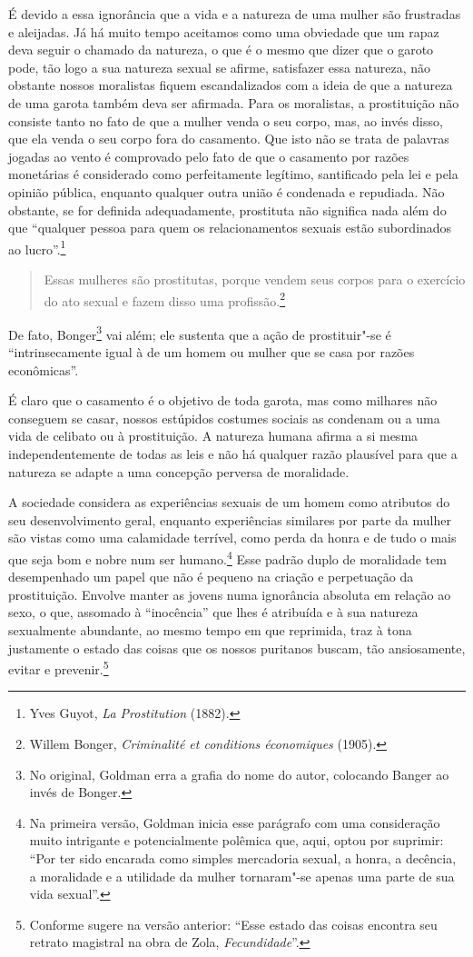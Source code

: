 É devido a essa ignorância que a vida e a natureza de uma mulher são
frustradas e aleijadas. Já há muito tempo aceitamos como uma obviedade
que um rapaz deva seguir o chamado da natureza, o que é o mesmo que
dizer que o garoto pode, tão logo a sua natureza sexual se afirme,
satisfazer essa natureza, não obstante nossos moralistas fiquem
escandalizados com a ideia de que a natureza de uma garota também deva
ser afirmada. Para os moralistas, a prostituição não consiste tanto no\label{vender}
fato de que a mulher venda o seu corpo, mas, ao invés disso, que ela
venda o seu corpo fora do casamento. Que isto não se trata de
palavras jogadas ao vento é comprovado pelo fato de que o casamento por razões
monetárias é considerado como perfeitamente legítimo, santificado pela
lei e pela opinião pública, enquanto qualquer outra união é condenada e
repudiada. Não obstante, se for definida adequadamente, prostituta
não significa nada além do que ``qualquer pessoa para quem os
relacionamentos sexuais estão subordinados ao lucro''.\footnote{Yves
  Guyot, \emph{La Prostitution} (1882).}

\begin{quote}
Essas mulheres são prostitutas, porque vendem seus corpos para o
exercício do ato sexual e fazem disso uma profissão.\footnote{Willem
  Bonger, \emph{Criminalité et conditions économiques} (1905).}
  \end{quote}

De fato, Bonger\footnote{No original, Goldman erra a grafia do nome do
  autor, colocando Banger ao invés de Bonger.} vai além; ele sustenta
que a ação de prostituir"-se é ``intrinsecamente igual à de um homem ou
mulher que se casa por razões econômicas''.

É claro que o casamento é o objetivo de toda garota, mas como milhares
não conseguem se casar, nossos estúpidos costumes sociais as condenam ou a
uma vida de celibato ou à prostituição. A natureza humana afirma a si
mesma independentemente de todas as leis e não há qualquer razão
plausível para que a natureza se adapte a uma concepção perversa de
moralidade.

A sociedade considera as experiências sexuais de um homem como atributos
do seu desenvolvimento geral, enquanto experiências similares por parte
da mulher são vistas como uma calamidade terrível, como perda da honra e
de tudo o mais que seja bom e nobre num ser humano.\footnote{Na primeira
  versão, Goldman inicia esse parágrafo com uma consideração muito
  intrigante e potencialmente polêmica que, aqui, optou por suprimir:
  ``Por ter sido encarada como simples mercadoria sexual, a honra, a
  decência, a moralidade e a utilidade da mulher tornaram"-se apenas uma
  parte de sua vida sexual''.} Esse padrão duplo de moralidade tem
desempenhado um papel que não é pequeno na criação e perpetuação da
prostituição. Envolve manter as jovens numa ignorância absoluta em relação ao sexo, o que, assomado à  ``inocência'' que lhes é atribuída e à sua natureza sexualmente abundante, ao mesmo tempo em que reprimida, traz à tona justamente o estado das coisas que os nossos puritanos buscam, tão ansiosamente, evitar e prevenir.\footnote{Conforme sugere na versão anterior:
  ``Esse estado das coisas encontra seu retrato magistral na obra de
  Zola, \emph{Fecundidade}''.}

